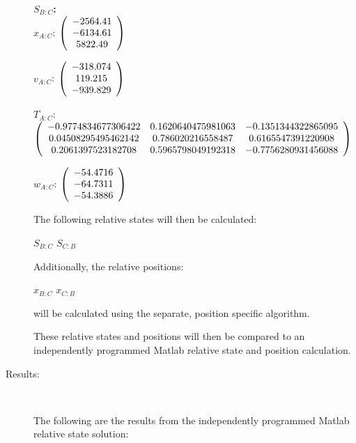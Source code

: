 \begin{description}
\Large{\textbf{$S_{B:C}$:}} \normalsize \\

$x_{A:C}$: $\left( \begin{array} {ccc}  -2564.41 \\   -6134.61 \\    5822.49
\end{array} \right)\\ \\$

$v_{A:C}$:  $\left( \begin{array} {ccc}  -318.074 \\    119.215 \\   -939.829
\end{array} \right)\\ \\$

$T_{A:C}$: $\left( \begin{array} {ccc}
 -0.9774834677306422 & 0.1620640475981063 & -0.1351344322865095 \\
  0.04508295495462142 & 0.786020216558487 & 0.6165547391220908 \\
   0.2061397523182708 & 0.5965798049192318 & -0.7756280931456088
\end{array} \right)\\ \\$

$w_{A:C}$:  $\left( \begin{array} {ccc} -54.4716 \\   -64.7311 \\   -54.3886
\end{array} \right)\\ \\$

The following relative states will then be calculated:

$S_{B:C}$
$S_{C:B}$

Additionally, the relative positions:

$x_{B:C}$
$x_{C:B}$

will be calculated using the separate, position specific algorithm.

These relative states and positions will then be compared to an
independently programmed Matlab relative state and position calculation.

\item[Results:] \ \newline

The following are the results from the independently programmed Matlab relative state
solution:


\end{description}
